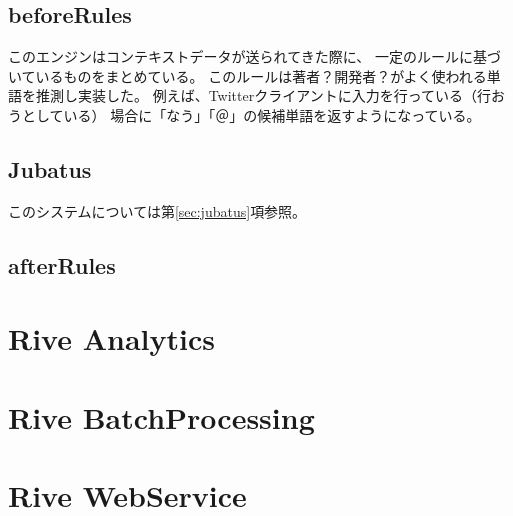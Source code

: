 \subsection{beforeRules}
このエンジンはコンテキストデータが送られてきた際に、
一定のルールに基づいているものをまとめている。
このルールは著者？開発者？がよく使われる単語を推測し実装した。
例えば、Twitter\cite{Twitter}クライアントに入力を行っている（行おうとしている）
場合に「なう」「＠」の候補単語を返すようになっている。

\subsection{Jubatus}
このシステムについては第\ref{sec:jubatus}項参照。

\subsection{afterRules}

\section{Rive Analytics}

\section{Rive BatchProcessing}

\section{Rive WebService}
